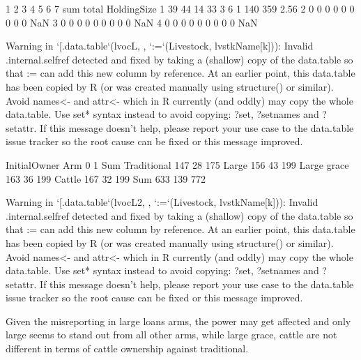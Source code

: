 
\begin{Schunk}
\begin{Soutput}
   1  2  3  4 5 6 7 sum total HoldingSize
1 39 44 14 33 3 6 1 140   359        2.56
2  0  0  0  0 0 0 0   0     0         NaN
3  0  0  0  0 0 0 0   0     0         NaN
4  0  0  0  0 0 0 0   0     0         NaN
\end{Soutput}
\begin{Soutput}
Warning in `[.data.table`(lvocL, , `:=`(Livestock, lvstkName[k])): Invalid .internal.selfref detected and fixed by taking a (shallow) copy of the data.table so that := can add this new column by reference. At an earlier point, this data.table has been copied by R (or was created manually using structure() or similar). Avoid names<- and attr<- which in R currently (and oddly) may copy the whole data.table. Use set* syntax instead to avoid copying: ?set, ?setnames and ?setattr. If this message doesn't help, please report your use case to the data.table issue tracker so the root cause can be fixed or this message improved.
\end{Soutput}
\end{Schunk}
\begin{Schunk}
\begin{Soutput}
             InitialOwner
Arm             0   1 Sum
  Traditional 147  28 175
  Large       156  43 199
  Large grace 163  36 199
  Cattle      167  32 199
  Sum         633 139 772
\end{Soutput}
\begin{Soutput}
Warning in `[.data.table`(lvocL2, , `:=`(Livestock, lvstkName[k])): Invalid .internal.selfref detected and fixed by taking a (shallow) copy of the data.table so that := can add this new column by reference. At an earlier point, this data.table has been copied by R (or was created manually using structure() or similar). Avoid names<- and attr<- which in R currently (and oddly) may copy the whole data.table. Use set* syntax instead to avoid copying: ?set, ?setnames and ?setattr. If this message doesn't help, please report your use case to the data.table issue tracker so the root cause can be fixed or this message improved.
\end{Soutput}
\end{Schunk}
Given the misreporting in large loans arms, the power may get affected and only \textsf{large} seems to stand out from all other arms, while \textsf{large grace, cattle} are not different in terms of cattle ownership against \textsf{traditional}. 








